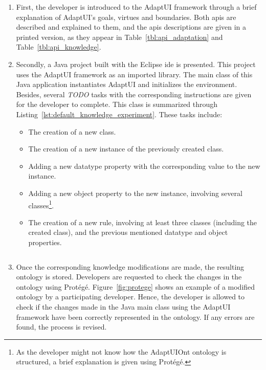 \begin{enumerate}
  \item First, the developer is introduced to the AdaptUI framework through a brief
  explanation of AdaptUI's goals, virtues and boundaries. Both \acp{api} are 
  described and explained to them, and the \acp{api} descriptions are given in a 
  printed version, as they appear in Table~\ref{tbl:api_adaptation} and
  Table~\ref{tbl:api_knowledge}.
  
  \item Secondly, a Java project built with the Eclipse \acs{ide} is presented. 
  This project uses the AdaptUI framework as an imported library. The main class 
  of this Java application instantiates AdaptUI and initializes the environment. 
  Besides, several \textit{TODO} tasks with the corresponding instructions are 
  given for the developer to complete. This class is summarized through
  Listing~\ref{lst:default_knowledge_experiment}. These tasks include:
  \begin{itemize}
    \item The creation of a new class.
    \item The creation of a new instance of the previously created class.
    \item Adding a new datatype property with the corresponding value to the
    new instance.
    \item Adding a new object property to the new instance, involving several
    classes\footnote{As the developer might not know how the AdaptUIOnt ontology
    is structured, a brief explanation is given using Protégé.}.
    \item The creation of a new rule, involving at least three classes (including
    the created class), and the previous mentioned datatype and object properties.
  \end{itemize}

  \inputminted[linenos=true, fontsize=\footnotesize, frame=lines]{java}{5_experiments_and_results/default_knowledge_experiment.java}

  \item Once the corresponding knowledge modifications are made, the resulting
  ontology is stored. Developers are requested to check the changes in the ontology
  using Protégé. Figure~\ref{fig:protege} shows an example of a modified ontology 
  by a participating developer. Hence, the developer is allowed to check if the 
  changes made in the Java main class using the AdaptUI framework have been 
  correctly represented in the ontology. If any errors are found, the process is 
  revised.


\end{enumerate}
